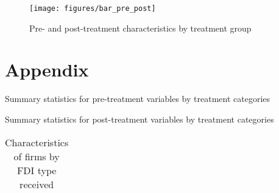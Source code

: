 \documentclass[11pt]{article}
\begin{document}
\begin{figure}[htbp!]\caption{Pre- and post-treatment characteristics by treatment group}\label{fig_treatment_type}
\begin{center}
\texttt{[image: figures/bar\_pre\_post]} 
\end{center}
\end{figure}


\newpage

\section{Appendix}
\begin{table}[htbp]\centering 
\caption{Summary statistics for pre-treatment variables by treatment categories\label{sumstat_treatment_type_pre}}

\end{table} 


\begin{table}[htbp]\centering \caption{Summary statistics for post-treatment variables by treatment categories\label{sumstat_treatment_type_post}}

\end{table} 

\begin{centering}
\begin{table}[htbp]\centering \caption{Characteristics of firms by FDI type received\label{treatment_type_char}}
\begin{tabular}[htbp!]{lrrrrrrrrrr}
\hline\hline

\hline\hline
\end{tabular} 
 \end{table}
 \end{centering}
\end{document}
